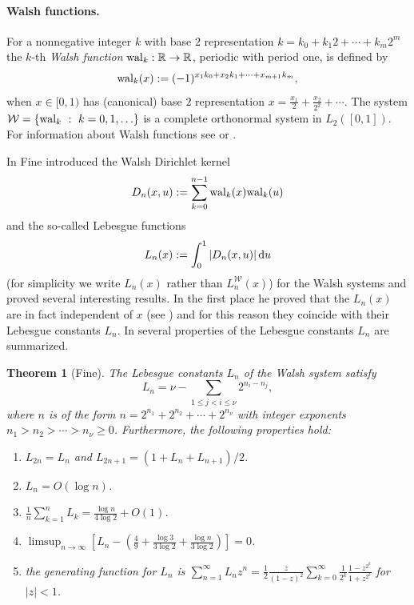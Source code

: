 \documentclass[12pt]{article}
\newtheorem{theorem}{Theorem}
\newcommand{\RR}{{\Bbb R}}
\newcommand{\wal}{{\rm wal}}
\newcommand{\rd}{\,{\rm d}}
\begin{document}
\paragraph{Walsh functions.} For a nonnegative integer $k$ with base $2$ representation $k=k_0+k_1 2+\cdots+k_m 2^m$ the $k$-th {\it Walsh function} $\wal_k:\RR \rightarrow \RR$, periodic with period one, is defined by 
\begin{eqnarray}
\wal_k(x):=(-1)^{x_1 k_0 +x_2 k_1+\cdots + x_{m+1} k_m},\nonumber
\end{eqnarray}
when $x \in [0,1)$ has (canonical) base $2$ representation $x=\frac{x_1}{2}+\frac{x_2}{2^2}+\cdots$. The system $\mathcal{W}=\{\wal_k \ : \ k=0,1,\ldots \}$ is a complete orthonormal system in $L_2([0,1])$. For information about Walsh functions see \cite{fine,SWS} or \cite[Appendix~A]{DP10}.

In \cite[Section~5]{fine} Fine introduced the Walsh Dirichlet kernel $$D_n(x,u):= \sum_{k=0}^{n-1} \wal_k(x) \wal_k(u)$$ and the so-called Lebesgue functions $$L_n(x):=\int_0^1|D_n(x,u)| \rd u$$ (for simplicity we write $L_n(x)$ rather than $L_n^{\mathcal{W}}(x)$) for the Walsh systems and proved several interesting results. In the first place he proved that the $L_n(x)$ are in fact independent of $x$ (see \cite[p.386]{fine}) and for this reason they coincide with their Lebesgue constants $L_n$. In \cite[Theorem~IX]{fine} several properties of the Lebesgue constants $L_n$ are summarized.

\begin{theorem}[Fine]\label{thm:fine}
The Lebesgue constants $L_n$ of the Walsh system satisfy 
\begin{equation}\label{fo:LCW}
L_n=\nu-\sum_{1 \le j < i \le \nu} 2^{n_i-n_{j}},
\end{equation}
where $n$ is of the form $n=2^{n_1}+2^{n_2}+\cdots+2^{n_{\nu}}$ with integer exponents $n_1 > n_2 > \cdots > n_{\nu}\ge 0$. Furthermore, the following properties hold:
\begin{enumerate}
\item $L_{2n}=L_n$ and $L_{2n+1}=(1+L_n+L_{n+1})/2$.
\item $L_n=O(\log n)$.
\item $\frac{1}{n} \sum_{k=1}^n L_k =\frac{\log n}{4 \log 2}+O(1)$.
\item $\limsup_{n \rightarrow \infty} \left[L_n-\left(\frac{4}{9}+\frac{\log 3}{3 \log 2}+\frac{\log n}{3 \log 2}\right)\right]=0$.
\item the generating function for $L_n$ is $\sum_{n=1}^{\infty} L_n z^n =\frac{1}{2} \frac{z}{(1-z)^2} \sum_{k=0}^{\infty}\frac{1}{2^k} \frac{1-z^{2^k}}{1+z^{2^k}}$ for $|z|<1$.
\end{enumerate}
\end{theorem}
\end{document}
